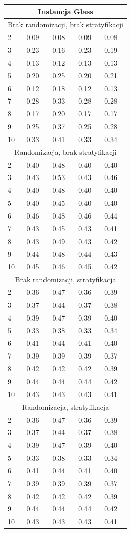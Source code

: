 \documentclass[12pt,a4paper]{article}
\begin{document}
\begin{tabular}{ |p{2.3cm}||p{2.5cm}|p{2.5cm}|p{2.5cm}|p{2.5cm}| }
\hline
\multicolumn{5}{|c|}{Instancja Glass}\\
\hline
\hline
\multicolumn{5}{|c|}{Brak randomizacji, brak stratyfikacji}\\
\hline
2&0.09& 0.08& 0.09& 0.08\\
3&0.23& 0.16& 0.23& 0.19\\
4&0.13& 0.12& 0.13& 0.13\\
5&0.20& 0.25& 0.20& 0.21\\
6&0.12& 0.18 & 0.12& 0.13\\
7&0.28& 0.33& 0.28& 0.28\\
8&0.17& 0.20& 0.17& 0.17\\
9&0.25& 0.37& 0.25& 0.28\\
10&0.33& 0.41& 0.33& 0.34\\
\hline
\multicolumn{5}{|c|}{Randomizacja, brak stratyfikacji}\\
\hline
2&0.40& 0.48& 0.40& 0.40\\
3&0.43& 0.53& 0.43& 0.46\\
4&0.40& 0.48& 0.40& 0.40\\
5&0.40& 0.45& 0.40& 0.40\\
6&0.46& 0.48& 0.46& 0.44\\
7&0.43& 0.45& 0.43& 0.41\\
8&0.43& 0.49& 0.43& 0.42\\
9&0.44& 0.48& 0.44& 0.43\\
10&0.45& 0.46& 0.45& 0.42\\
\hline
\multicolumn{5}{|c|}{Brak randomizacji, stratyfikacja}\\
\hline
2&0.36& 0.47& 0.36& 0.39\\
3&0.37& 0.44& 0.37& 0.38\\
4&0.39& 0.47& 0.39& 0.40\\
5&0.33& 0.38& 0.33& 0.34\\
6&0.41& 0.44& 0.41& 0.40\\
7&0.39& 0.39& 0.39& 0.37\\
8&0.42& 0.42& 0.42& 0.39\\
9&0.44& 0.44& 0.44& 0.42\\
10&0.43& 0.43& 0.43& 0.41\\
\hline
\multicolumn{5}{|c|}{Randomizacja, stratyfikacja}\\
\hline
2&0.36& 0.47& 0.36& 0.39\\
3&0.37& 0.44& 0.37& 0.38\\
4&0.39& 0.47& 0.39& 0.40\\
5&0.33& 0.38& 0.33& 0.34\\
6&0.41& 0.44& 0.41& 0.40\\
7&0.39& 0.39& 0.39& 0.37\\
8&0.42& 0.42& 0.42& 0.39\\
9&0.44& 0.44& 0.44& 0.42\\
10&0.43& 0.43& 0.43& 0.41\\
\hline
\end{tabular}
\end{document}

